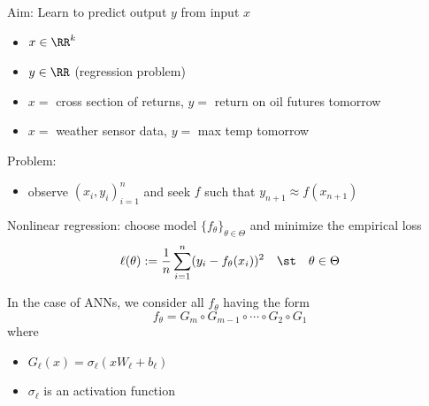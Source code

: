 \begin{frame}
    
    Aim: Learn to predict output $y$ from input $x$
    \begin{itemize}
        \item $x \in \RR^k$
        \vspace{0.5em}
        \item $y \in \RR$  (regression problem)
    \end{itemize}

    \Egs
    \begin{itemize}
        \item $x = $ cross section of returns, $y = $ return on oil futures tomorrow
        \vspace{0.5em}
        \item $x = $ weather sensor data, $y = $ max temp tomorrow
    \end{itemize}
        \vspace{0.5em}
        \vspace{0.5em}

    Problem:

    \begin{itemize}
        \item observe $(x_i, y_i)_{i=1}^n$ and seek $f$ such that $y_{n+1}
            \approx f(x_{n+1})$
    \end{itemize}


\end{frame}



\begin{frame}

    Nonlinear regression: choose model $\{f_\theta\}_{\theta \in \Theta}$ and minimize the empirical loss
    \begin{equation*}
        \ell(\theta) := \frac{1}{n}\sum_{i=1}^n (y_i - f_\theta(x_i))^2
        \quad \st \quad \theta \in \Theta
    \end{equation*}


    \pause
    \vspace{0.5em}
    In the case of ANNs, we consider all $f_\theta$ having the form
    \begin{equation*}
        f_\theta
        = G_{m} \circ G_{m-1} \circ \cdots \circ G_{2}  \circ G_{1}
    \end{equation*}
    where
    \begin{itemize}
        \item $G_{\ell} (x) = \sigma_\ell(x W_\ell + b_\ell)$ 
        \vspace{0.5em}
        \item $\sigma_\ell$ is an activation function
    \end{itemize}

\end{frame}

